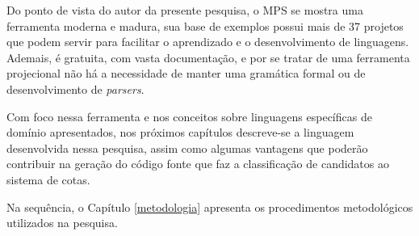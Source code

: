 Do ponto de vista do autor da presente pesquisa, o \gls{MPS} se mostra uma ferramenta moderna e madura, sua base de exemplos possui mais de 37 projetos que podem servir para facilitar o aprendizado e o desenvolvimento de linguagens. Ademais, é gratuita, com vasta documentação, e por se tratar de uma ferramenta projecional não há a necessidade de manter uma gramática formal ou de desenvolvimento de \textit{parsers}.


Com foco nessa ferramenta e nos conceitos sobre linguagens específicas de domínio apresentados, nos próximos capítulos descreve-se a linguagem desenvolvida nessa pesquisa, assim como algumas vantagens que poderão contribuir na geração do código fonte que faz a classificação de candidatos ao sistema de cotas.

Na sequência, o Capítulo \ref{metodologia} apresenta os procedimentos metodológicos utilizados na pesquisa.